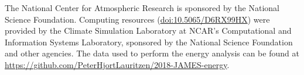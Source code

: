 \documentclass{agujournal}
\begin{document}
%
%
%
%
%
%
%


\acknowledgments
The National Center for Atmospheric Research is sponsored by the National Science Foundation. Computing resources ({\url{doi:10.5065/D6RX99HX}}) were provided by the Climate Simulation Laboratory at NCAR's Computational and Information Systems Laboratory, sponsored by the National Science Foundation and other agencies. The data used to perform the energy analysis can be found at {\url{https://github.com/PeterHjortLauritzen/2018-JAMES-energy}}.



\end{document}
